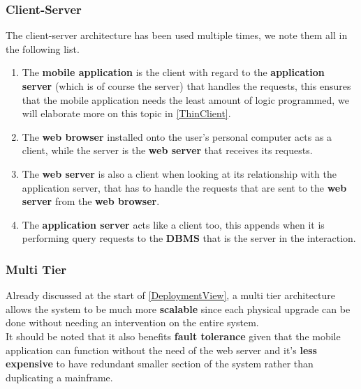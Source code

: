 \subsubsection{Client-Server}
The client-server architecture has been used multiple times, we note them all in the following list.
\begin{enumerate}
\item The \textbf{mobile application} is the client with regard to the \textbf{application server} (which is of course the server) that handles the requests, this ensures that the mobile application needs the least amount of logic programmed, we will elaborate more on this topic in \autoref{ThinClient}.
\item The \textbf{web browser} installed onto the user's personal computer acts as a client, while the server is the \textbf{web server} that receives its requests.
\item The \textbf{web server} is also a client when looking at its relationship with the application server, that has to handle the requests that are sent to the \textbf{web server} from the \textbf{web browser}.
\item The \textbf{application server} acts like a client too, this appends when it is performing query requests to the \textbf{DBMS} that is the server in the interaction.
\end{enumerate}

\subsubsection{Multi Tier}
Already discussed at the start of \autoref{DeploymentView}, a multi tier architecture allows the system to be much more \textbf{scalable} since each physical upgrade can be done without needing an intervention on the entire system.\\
It should be noted that it also benefits \textbf{fault tolerance} given that the mobile application can function without the need of the web server and it's \textbf{less expensive} to have redundant smaller section of the system rather than duplicating a mainframe.


